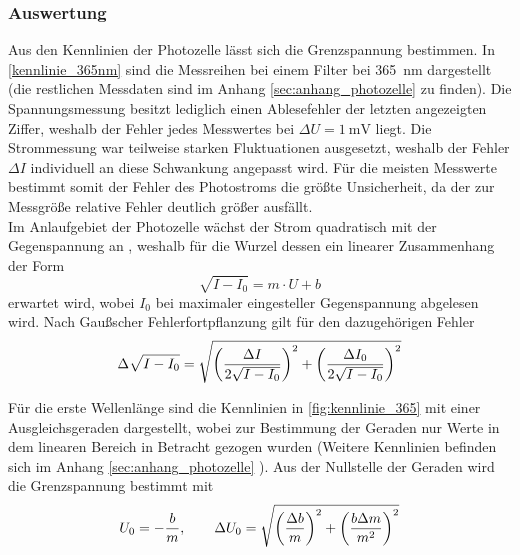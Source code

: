 \subsubsection{Auswertung}



Aus den Kennlinien der Photozelle lässt sich die Grenzspannung bestimmen. In \cref{kennlinie_365nm} sind die
Messreihen bei einem Filter bei \SI{365}{\nano\meter} dargestellt (die restlichen Messdaten sind im Anhang
\ref{sec:anhang_photozelle} zu finden). Die Spannungsmessung besitzt lediglich einen Ablesefehler der letzten
angezeigten Ziffer, weshalb der Fehler jedes Messwertes bei $\Delta U = \SI{1}{\milli\volt}$ liegt.
Die Strommessung war teilweise starken Fluktuationen ausgesetzt, weshalb der Fehler $\Delta I$
individuell an diese Schwankung angepasst wird. Für die meisten Messwerte bestimmt somit der Fehler
des Photostroms die größte Unsicherheit, da der zur Messgröße relative Fehler deutlich größer ausfällt.\\
Im Anlaufgebiet der Photozelle wächst der Strom quadratisch mit der Gegenspannung an
\cite[S.21]{skript},
weshalb für die Wurzel dessen ein linearer Zusammenhang der Form
\begin{equation}
	\sqrt{I - I_0} = m\cdot U + b \nonumber
\end{equation}
erwartet wird, wobei $I_0$ bei maximaler eingesteller Gegenspannung abgelesen wird.
Nach Gaußscher Fehlerfortpflanzung\cite{wiki:fehlerfortpflanzung} gilt für den dazugehörigen Fehler
\begin{equation}
	\Delta\sqrt{I - I_0} = \sqrt{\qty(\frac{\Delta I}{2\sqrt{I-I_0}})^2 + \qty(\frac{\Delta I_0}{2\sqrt{I-I_0}})^2} \nonumber
\end{equation}

Für die erste Wellenlänge sind die Kennlinien in \cref{fig:kennlinie_365} mit einer Ausgleichsgeraden
dargestellt, wobei zur Bestimmung der Geraden nur Werte in dem linearen Bereich in Betracht gezogen wurden
(Weitere Kennlinien befinden sich im Anhang \ref{sec:anhang_photozelle}
). Aus der Nullstelle der Geraden wird die Grenzspannung
bestimmt mit
\begin{equation}
	U_0 = - \frac{b}{m},\qquad \Delta U_0 = \sqrt{\qty(\frac{\Delta b}{m})^2 + \qty(\frac{b\Delta m}{m^2})^2}
	\nonumber
	\label{eq:bestimmung_grenzspannung}
\end{equation}



